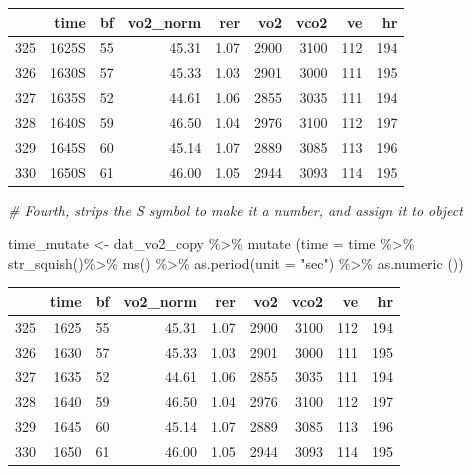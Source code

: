 \documentclass[
]{book}
\newenvironment{Shaded}{\begin{snugshade}}{\end{snugshade}}
\newcommand{\AttributeTok}[1]{\textcolor[rgb]{0.77,0.63,0.00}{#1}}
\newcommand{\CommentTok}[1]{\textcolor[rgb]{0.56,0.35,0.01}{\textit{#1}}}
\newcommand{\FunctionTok}[1]{\textcolor[rgb]{0.00,0.00,0.00}{#1}}
\newcommand{\NormalTok}[1]{#1}
\newcommand{\OtherTok}[1]{\textcolor[rgb]{0.56,0.35,0.01}{#1}}
\newcommand{\SpecialCharTok}[1]{\textcolor[rgb]{0.00,0.00,0.00}{#1}}
\newcommand{\StringTok}[1]{\textcolor[rgb]{0.31,0.60,0.02}{#1}}
\begin{document}
\begin{tabular}{l|r|r|r|r|r|r|r|r}
\hline
  & time & bf & vo2\_norm & rer & vo2 & vco2 & ve & hr\\
\hline
325 & 1625S & 55 & 45.31 & 1.07 & 2900 & 3100 & 112 & 194\\
\hline
326 & 1630S & 57 & 45.33 & 1.03 & 2901 & 3000 & 111 & 195\\
\hline
327 & 1635S & 52 & 44.61 & 1.06 & 2855 & 3035 & 111 & 194\\
\hline
328 & 1640S & 59 & 46.50 & 1.04 & 2976 & 3100 & 112 & 197\\
\hline
329 & 1645S & 60 & 45.14 & 1.07 & 2889 & 3085 & 113 & 196\\
\hline
330 & 1650S & 61 & 46.00 & 1.05 & 2944 & 3093 & 114 & 195\\
\hline
\end{tabular}

\begin{Shaded}
\begin{Highlighting}[]
\CommentTok{\# Fourth, strips the S symbol to make it a number, and assign it to object}

\NormalTok{time\_mutate }\OtherTok{\textless{}{-}}\NormalTok{ dat\_vo2\_copy }\SpecialCharTok{\%\textgreater{}\%}
  \FunctionTok{mutate}\NormalTok{ (}\AttributeTok{time =}\NormalTok{ time }\SpecialCharTok{\%\textgreater{}\%} 
                 \FunctionTok{str\_squish}\NormalTok{()}\SpecialCharTok{\%\textgreater{}\%}  
                 \FunctionTok{ms}\NormalTok{() }\SpecialCharTok{\%\textgreater{}\%}
                 \FunctionTok{as.period}\NormalTok{(}\AttributeTok{unit =} \StringTok{"sec"}\NormalTok{) }\SpecialCharTok{\%\textgreater{}\%} 
                 \FunctionTok{as.numeric}\NormalTok{ ())}
\end{Highlighting}
\end{Shaded}

\begin{tabular}{l|r|r|r|r|r|r|r|r}
\hline
  & time & bf & vo2\_norm & rer & vo2 & vco2 & ve & hr\\
\hline
325 & 1625 & 55 & 45.31 & 1.07 & 2900 & 3100 & 112 & 194\\
\hline
326 & 1630 & 57 & 45.33 & 1.03 & 2901 & 3000 & 111 & 195\\
\hline
327 & 1635 & 52 & 44.61 & 1.06 & 2855 & 3035 & 111 & 194\\
\hline
328 & 1640 & 59 & 46.50 & 1.04 & 2976 & 3100 & 112 & 197\\
\hline
329 & 1645 & 60 & 45.14 & 1.07 & 2889 & 3085 & 113 & 196\\
\hline
330 & 1650 & 61 & 46.00 & 1.05 & 2944 & 3093 & 114 & 195\\
\hline
\end{tabular}
\end{document}
